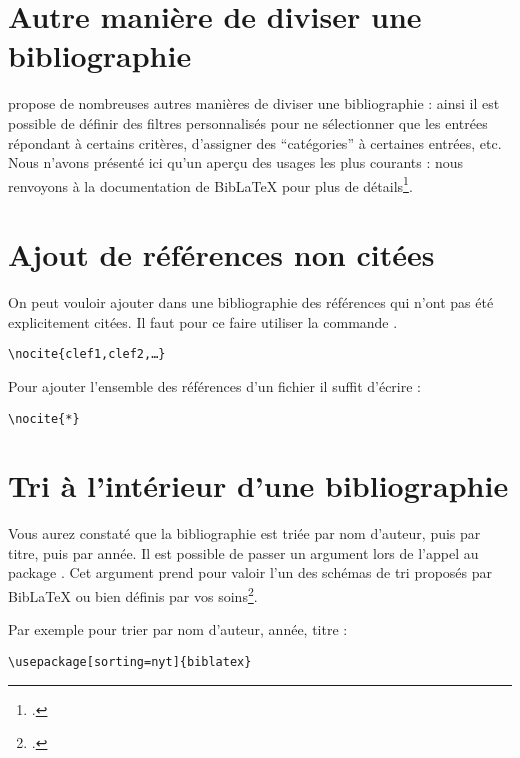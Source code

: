 \section{Autre manière de diviser une bibliographie}

 propose de nombreuses autres manières de diviser une bibliographie : ainsi il est possible de définir des filtres personnalisés pour ne sélectionner que les entrées répondant à certains critères, d'assigner des \enquote{catégories} à certaines entrées, etc. Nous n'avons présenté ici qu'un aperçu des usages les plus courants : nous renvoyons à la documentation de BibLaTeX pour plus de détails\footcite{biblatexdivisionbiblio}.

\section{Ajout de références non citées}

On peut vouloir ajouter dans une bibliographie des références qui n'ont pas été explicitement citées. Il faut pour ce faire utiliser la commande .

\begin{verbatim}
\nocite{clef1,clef2,…}
\end{verbatim}


Pour ajouter l'ensemble des références d'un fichier  il suffit d'écrire :
\begin{verbatim}
\nocite{*}
\end{verbatim}

\section{Tri à l'intérieur d'une bibliographie}

Vous aurez constaté que la bibliographie est triée par nom d'auteur, puis par titre, puis par année. Il est possible de passer un argument  lors de l'appel au package . Cet argument prend pour valoir l'un des schémas de tri proposés par BibLaTeX ou bien définis par vos soins\footcites[Pour les schémas de tri standards voir][]{biblatextri}[pour les schémas personnalisés][]{biblatextriperso}.

Par exemple pour trier par nom d'auteur, année, titre :

\begin{verbatim}
\usepackage[sorting=nyt]{biblatex}
\end{verbatim}

